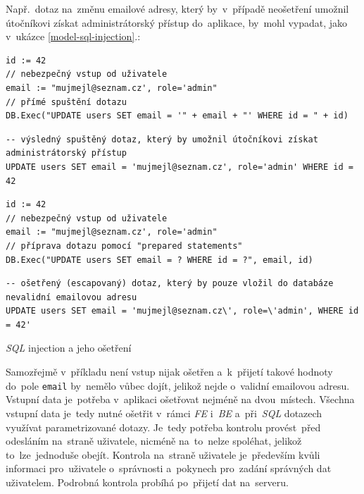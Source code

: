 \documentclass[11pt,a4paper]{report}
\let\oldacrshort\acrshort
\renewcommand{\acrshort}[1]{\emph{\normalsize\color[rgb]{0,0,0}\noindent\oldacrshort{#1}}}
\begin{document}
                Např.~dotaz na~změnu emailové adresy, který by~v~případě neošetření umožnil útočníkovi získat administrátorský přístup do~aplikace, by~mohl vypadat, jako v~ukázce \ref{model-sql-injection}.:
                \begin{code}
                    \centering
                    \begin{minipage}{0.48\textwidth}
                        \begin{verbatim}
id := 42
// nebezpečný vstup od uživatele
email := "mujmejl@seznam.cz', role='admin"
// přímé spuštění dotazu
DB.Exec("UPDATE users SET email = '" + email + "' WHERE id = " + id)
                        \end{verbatim}
                        \begin{verbatim}
-- výsledný spuštěný dotaz, který by umožnil útočníkovi získat administrátorský přístup
UPDATE users SET email = 'mujmejl@seznam.cz', role='admin' WHERE id = 42
                        \end{verbatim}
                        \subcaption{Neošetřený řetězec vložený do \acrshort{SQL}}
                    \end{minipage}
                    \begin{minipage}{0.48\textwidth}
                        \begin{verbatim}
id := 42
// nebezpečný vstup od uživatele
email := "mujmejl@seznam.cz', role='admin"
// příprava dotazu pomocí "prepared statements"
DB.Exec("UPDATE users SET email = ? WHERE id = ?", email, id)
                        \end{verbatim}
                        \begin{verbatim}
-- ošetřený (escapovaný) dotaz, který by pouze vložil do databáze nevalidní emailovou adresu
UPDATE users SET email = 'mujmejl@seznam.cz\', role=\'admin', WHERE id = 42'
                        \end{verbatim}
                    \end{minipage}
                    \caption{\acrshort{SQL} injection a jeho ošetření}
                    \label{model-sql-injection}
                \end{code}

                Samozřejmě v~příkladu není vstup nijak ošetřen a~k~přijetí takové hodnoty do~pole \texttt{email} by~nemělo vůbec dojít, jelikož nejde o~validní emailovou adresu. Vstupní data je~potřeba v~aplikaci ošetřovat nejméně na dvou~místech. Všechna vstupní data je~tedy nutné ošetřit v~rámci \acrshort{FE} i~\acrshort{BE} a~při~\acrshort{SQL} dotazech využívat parametrizované dotazy. Je~tedy potřeba kontrolu provést~před odesláním na~straně uživatele, nicméně na~to~nelze spoléhat, jelikož to~lze~jednoduše obejít. Kontrola na~straně uživatele je~především kvůli informaci pro~uživatele o~správnosti a~pokynech pro~zadání správných dat uživatelem. Podrobná kontrola probíhá po~přijetí dat na~serveru.
                
\end{document}
